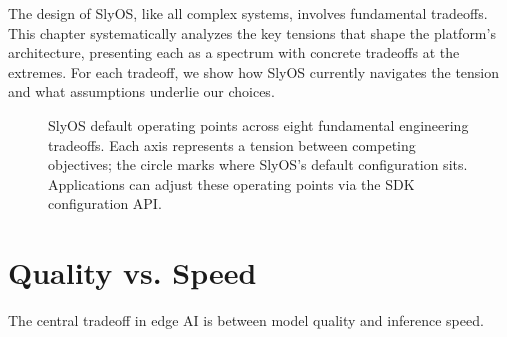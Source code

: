 \documentclass[12pt, letterpaper, twoside]{report}
\begin{document}
The design of SlyOS, like all complex systems, involves fundamental tradeoffs. This chapter systematically analyzes the key tensions that shape the platform's architecture, presenting each as a spectrum with concrete tradeoffs at the extremes. For each tradeoff, we show how SlyOS currently navigates the tension and what assumptions underlie our choices.

\begin{figure}[H]
\centering
{}
\caption{SlyOS default operating points across eight fundamental engineering tradeoffs. Each axis represents a tension between competing objectives; the circle marks where SlyOS's default configuration sits. Applications can adjust these operating points via the SDK configuration API.}
\label{fig:tradeoff_spectrum}
\end{figure}

\section{Quality vs. Speed}
\label{sec:quality_speed}

The central tradeoff in edge AI is between model quality and inference speed.
\end{document}
